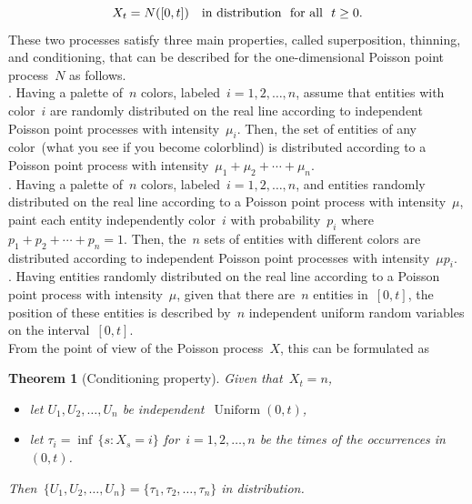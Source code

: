 \documentclass[10pt,a4paper]{amsart}
\DeclareMathOperator{\uniform}{Uniform}
\newtheorem{theorem}{Theorem}
\begin{document}
 $$ X_t = N ([0, t]) \quad \hbox{in distribution \ for all \ $t \geq 0$}. $$
 These two processes satisfy three main properties, called superposition, thinning, and conditioning, that can be described for the one-dimensional Poisson point process~$N$ as follows. \vspace*{4pt} \\
.
 Having a palette of~$n$ colors, labeled~$i = 1, 2, \ldots, n$, assume that entities with color~$i$ are randomly distributed on the real line according to independent Poisson point processes with intensity~$\mu_i$.
 Then, the set of entities of any color~(what you see if you become colorblind) is distributed according to a Poisson point process with intensity~$\mu_1 + \mu_2 + \cdots + \mu_n$. \vspace*{4pt} \\
.
 Having a palette of~$n$ colors, labeled~$i = 1, 2, \ldots, n$, and entities randomly distributed on the real line according to a Poisson point process with intensity~$\mu$, paint each entity independently color~$i$ with probability~$p_i$ where~$p_1 + p_2 + \cdots + p_n = 1$.
 Then, the~$n$ sets of entities with different colors are distributed according to independent Poisson point processes with intensity~$\mu p_i$. \vspace*{4pt} \\
.
 Having entities randomly distributed on the real line according to a Poisson point process with intensity~$\mu$, given that there are~$n$ entities in~$[0, t]$, the position of these entities is described by~$n$ independent uniform random variables on the interval~$[0, t]$. \vspace*{4pt} \\
 From the point of view of the Poisson process~$X$, this can be formulated as
\begin{theorem}[Conditioning property]
\label{th:poisson}
 Given that~$X_t = n$,
\begin{itemize}
\item let $U_1, U_2, \ldots, U_n$ be independent~$\uniform (0, t)$, \vspace*{4pt}
\item let $\tau_i = \inf \,\{s : X_s = i \}$ for~$i = 1, 2, \ldots, n$ be the times of the occurrences in~$(0, t)$.
\end{itemize}
 Then~$\{U_1, U_2, \ldots, U_n \} = \{\tau_1, \tau_2, \ldots, \tau_n \}$ in distribution.
\end{theorem}
\noindent
\end{document}
